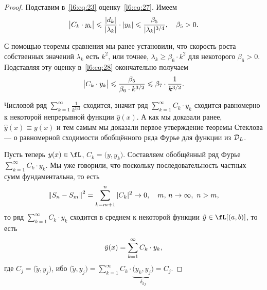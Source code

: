 \begin{proof}
	\noindent Подставим в~\eqref{l6:eq:23} оценку~\eqref{l6:eq:27}. Имеем 
	\begin{equation}
		\label{l6:eq:28}
		\hfill\big|C_k\cdot y_k\big|\leqslant\frac{|d_k|}{|\lambda_k|}\cdot|y_k|\leqslant\frac{\beta_5}{|\lambda_k|^{3/4}},\quad\beta_5>0.\hfill
	\end{equation}
	
	С помощью теоремы сравнения мы ранее установили, что скорость роста собственных значений $\lambda_k$ есть $k^2$, или точнее, $\lambda_k\geqslant\beta_6\cdot k^2$ для некоторого $\beta_6>0$. Подставляя эту оценку в~\eqref{l6:eq:28} окончательно получаем 
	\begin{equation}
		\hfill\big|C_k\cdot y_k\big|\leqslant\frac{\beta_5}{\beta_6\cdot k^{3/2}}\leqslant\beta_7\cdot\frac{1}{k^{3/2}}.\hfill
	\end{equation}
	
	Числовой ряд $\sum\limits_{k=1}^{\infty}\frac{\textstyle1}{\textstyle k^{3/2}}$ сходится, значит ряд $\sum\limits_{k=1}^{\infty}C_k\cdot y_k$ сходится равномерно к некоторой непрерывной функции $\hat{y}(x)$. А как мы доказали ранее, $\hat{y}(x)\equiv y(x)$ и тем самым мы доказали первое утверждение теоремы Стеклова --- о равномерной сходимости обобщённого ряда Фурье для функции из $\mathcal{D}_L$.
	\vspace{0,2cm}
	
	Пусть теперь $y(x)\in\fL$, $C_k=\big(y,y_k\big)$. Составляем обобщённый ряд Фурье $\sum\limits_{k=1}^{\infty}C_k\cdot y_k$. Мы уже говорили, что поскольку последовательность частных сумм фундаментальна, то есть
	\begin{equation*}
		\hfill{\norm{S_n-S_m}}^2=\sum\limits_{k=m+1}^n|C_k|^2\to0,\quad m,\,n\to\infty,\ n>m,\hfill
	\end{equation*}
	то ряд $\sum\limits_{k=1}^{\infty}C_k\cdot y_k$ сходится в среднем к некоторой функции $\tilde{y}\in\fL[(a,b)]$, то есть
	\begin{equation}
		\label{l6:eq:30}
		\hfill \tilde{y}(x)=\sum\limits_{k=1}^{\infty}C_k\cdot y_k,\hfill
	\end{equation}
	где $C_j=\big(\tilde{y},y_j\big)$, ибо $\big(\tilde{y},y_j\big)=\sum\limits_{k=1}^{\infty}C_k\cdot\underbrace{\big(y_k,y_j\big)}_{\delta_{kj}}=C_j$.
	

\end{proof}
